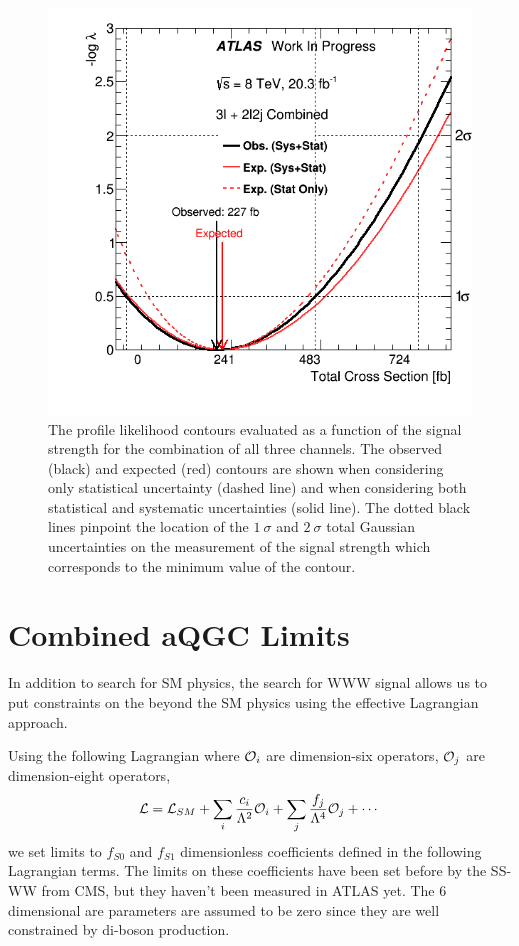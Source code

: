 \begin{figure}[ht!]
\centering
\includegraphics[scale=0.7]{figures/combination/interval_comb.png}
\caption{The profile likelihood contours evaluated as a function of the signal strength
for the combination of all three channels. 
The observed (black) and expected (red) contours are shown when considering only statistical uncertainty (dashed line) and when considering both statistical and systematic uncertainties (solid line).
The dotted black
lines pinpoint the location of the $1~\sigma$ and $2~\sigma$ total Gaussian uncertainties
on the measurement of the signal strength which corresponds to the minimum value of the contour.}
\label{fig:stat_measurement_interval_combination}
\end{figure}




\section{Combined aQGC Limits}

In addition to search for SM physics, the search for WWW signal allows us to put constraints on the beyond the SM physics using the effective Lagrangian approach. 

Using the following Lagrangian where ${\cal{O}}_i$ are dimension-six operators, ${\cal{O}}_j$ are dimension-eight operators,
\begin{equation}
{\cal{L}} = {\cal{L}}_{SM} + \sum\limits_{i} \frac{c_i}{\Lambda^2} {\cal{O}}_i + \sum\limits_{j} \frac{f_j}{\Lambda^4} {\cal{O}}_j + \cdots
\end{equation}
we set limits to $f_{S0}$ and $f_{S1}$ dimensionless coefficients defined in the following Lagrangian terms. The limits on these coefficients have been set before by the SS-WW from CMS, but they haven't been measured in ATLAS yet. The 6 dimensional are parameters are assumed to be zero since they are well constrained by di-boson production. 

